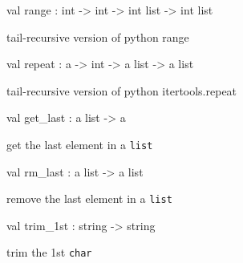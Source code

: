 \documentclass[11pt]{article}
\begin{document}
\label{val:Util.range}\begin{ocamldoccode}
val range : int -> int -> int list -> int list
\end{ocamldoccode}
\begin{ocamldocdescription}
tail-recursive version of python range


\end{ocamldocdescription}




\label{val:Util.repeat}\begin{ocamldoccode}
val repeat : {\textquotesingle}a -> int -> {\textquotesingle}a list -> {\textquotesingle}a list
\end{ocamldoccode}
\begin{ocamldocdescription}
tail-recursive version of python itertools.repeat


\end{ocamldocdescription}




\label{val:Util.get-underscorelast}\begin{ocamldoccode}
val get_last : {\textquotesingle}a list -> {\textquotesingle}a
\end{ocamldoccode}
\begin{ocamldocdescription}
get the last element in a {\tt{list}}


\end{ocamldocdescription}




\label{val:Util.rm-underscorelast}\begin{ocamldoccode}
val rm_last : {\textquotesingle}a list -> {\textquotesingle}a list
\end{ocamldoccode}
\begin{ocamldocdescription}
remove the last element in a {\tt{list}}


\end{ocamldocdescription}




\label{val:Util.trim-underscore1st}\begin{ocamldoccode}
val trim_1st : string -> string
\end{ocamldoccode}
\begin{ocamldocdescription}
trim the 1st {\tt{char}}


\end{ocamldocdescription}
\end{document}
